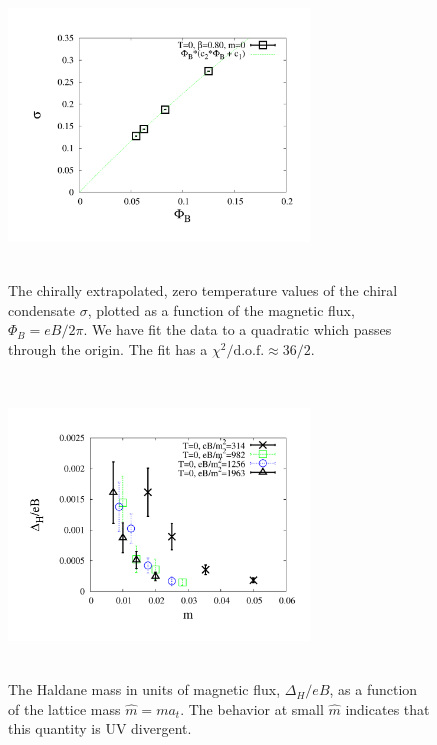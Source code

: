 \documentclass[aps,prd,twocolumn,showpacs,superscriptaddress,groupedaddress]{revtex4}  %
\begin{document}
\begin{figure}
 \includegraphics[height=8cm,width=8cm]{pbp_vs_PHI_NL_graphene_paper.pdf} \hspace{-1cm}
\caption{The chirally extrapolated, zero temperature values of the chiral condensate $\sigma$, plotted as a function of the magnetic flux,  $\Phi_B = eB/2\pi$. We have fit the data to a quadratic which passes through the origin. The fit has a $\chi^2/\text{d.o.f.} \approx 36/2$. } 
\label{PBPzeroTChiralvseB}
\end{figure}

\begin{figure}
 \includegraphics[height=8cm,width=8cm]{haldanediveB_vs_m_zeroT_graphene_paper.pdf} \hspace{-1cm}
\caption{The Haldane mass in units of magnetic flux, $\Delta_H/eB$, as a function of the lattice mass $\hat{m} = m a_t$. The behavior at small $\hat{m}$ indicates that
this quantity is UV divergent.}
\label{HaldanediveBvsm} 
\end{figure}
\end{document}
